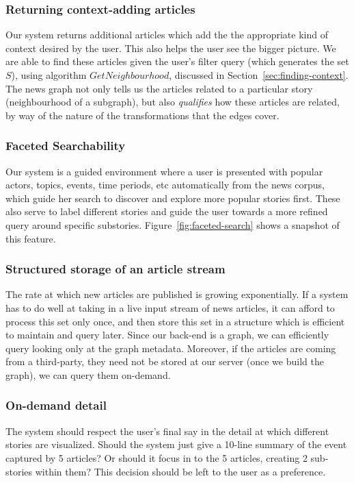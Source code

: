 \subsubsection{Returning context-adding articles}
Our system returns additional articles which add the the appropriate kind of context desired by the user. This also helps the user see the bigger picture. 
We are able to find these articles given the user's filter query (which generates the set $S$), using algorithm $GetNeighbourhood$, discussed in Section~\ref{sec:finding-context}. The news graph not only tells us the articles related to a particular story (neighbourhood of a subgraph), but also \emph{qualifies} how these articles are related, by way of the nature of the transformations that the edges cover. 

\subsubsection{Faceted Searchability}
Our system is a guided environment where a user is presented with popular actors, topics, events, time periods, etc automatically from the 
news corpus, which guide her search to discover and explore more popular stories first. These also serve to label different stories and guide the
user towards a more refined query around specific substories. Figure~\ref{fig:faceted-search} shows a snapshot of this feature.



\subsubsection{Structured storage of an article stream}
The rate at which new articles are published is growing exponentially. If a system
has to do well at taking in a live input stream of news articles, it can afford to process this set only once, and then store this set in a structure
which is efficient to maintain and query later. Since our back-end is a graph, we can efficiently query looking only at the graph metadata. 
Moreover, if the articles are coming from a third-party, they need not be stored at our server (once we build the graph), we can query them on-demand. 

\subsubsection{On-demand detail}
The system should respect the user's final say in the detail at which different stories are visualized. Should the system
just give a 10-line summary of the event captured by 5 articles? Or should it focus in to the 5 articles, creating 2 sub-stories within them? This decision
should be left to the user as a preference.

